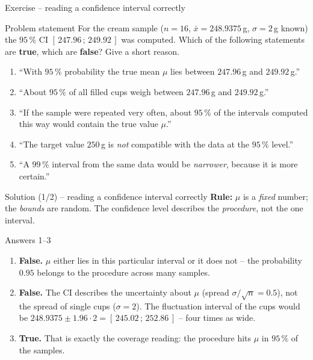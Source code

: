 \documentclass[aspectratio=169,11pt]{beamer}
\begin{document}
\begin{frame}{Exercise -- reading a confidence interval correctly}
  \begin{block}{Problem statement}
    For the cream sample ($n=16$, $\bar x=248.9375$\,g, $\sigma=2$\,g known)
    the $95\,\%$ CI $[\,247.96\,;\,249.92\,]$ was computed. Which of the
    following statements are \textbf{true}, which are \textbf{false}? Give a
    short reason.
  \end{block}
  \small
  \begin{enumerate}\setlength{\itemsep}{2pt}
    \item ``With $95\,\%$ probability the true mean $\mu$ lies between
          $247.96$\,g and $249.92$\,g.''
    \item ``About $95\,\%$ of all filled cups weigh between $247.96$\,g and
          $249.92$\,g.''
    \item ``If the sample were repeated very often, about $95\,\%$ of the
          intervals computed this way would contain the true value $\mu$.''
    \item ``The target value $250$\,g is \emph{not} compatible with the data
          at the $95\,\%$ level.''
    \item ``A $99\,\%$ interval from the same data would be \emph{narrower},
          because it is more certain.''
  \end{enumerate}
\end{frame}

\begin{frame}{Solution (1/2) -- reading a confidence interval correctly}
  \textbf{Rule:} $\mu$ is a \emph{fixed} number; the \emph{bounds} are random.
  The confidence level describes the \emph{procedure}, not the one interval.
  \begin{exampleblock}{Answers 1--3}
    \begin{enumerate}\setlength{\itemsep}{3pt}
      \item \textbf{False.} $\mu$ either lies in this particular interval or it
            does not -- the probability $0.95$ belongs to the procedure across
            many samples.
      \item \textbf{False.} The CI describes the uncertainty about $\mu$
            (spread $\sigma/\sqrt n=0.5$), not the spread of single cups
            ($\sigma=2$). The fluctuation interval of the cups would be
            $248.9375\pm1.96\cdot2=\mathbf{[\,245.02\,;\,252.86\,]}$ -- four
            times as wide.
      \item \textbf{True.} That is exactly the coverage reading: the procedure
            hits $\mu$ in $95\,\%$ of the samples.
    \end{enumerate}
  \end{exampleblock}
\end{frame}
\end{document}
